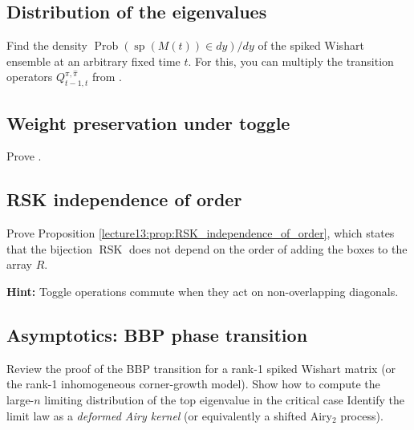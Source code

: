 \documentclass[letterpaper,11pt,oneside,reqno]{book}
\numberwithin{equation}{chapter}  %
\theoremstyle{definition}
\begin{document}
\subsection{Distribution of the eigenvalues}
\label{lecture13:prob:Wishart_non_null}

Find the density
$\operatorname{Prob}\left( \operatorname{sp}(M(t))\in dy \right)/dy$
of the spiked Wishart ensemble
at an arbitrary fixed time $t$.
For this, you can multiply the transition operators
$Q^{\pi,\hat\pi}_{t-1,t}$ from .


\subsection{Weight preservation under toggle}
\label{lecture13:prob:toggle_weight_preservation}

Prove .


\subsection{RSK independence of order}
\label{lecture13:prob:RSK_independence_of_order}

Prove Proposition \ref{lecture13:prop:RSK_independence_of_order}, which states that the bijection $\operatorname{RSK}$ does not depend on the order of adding the boxes to the array $R$.

\medskip
\noindent
\textbf{Hint:} Toggle operations commute when they act on non-overlapping diagonals.




\subsection{Asymptotics: BBP phase transition}
Review the proof of the BBP transition for a rank-1 spiked
Wishart matrix (or the rank-1 inhomogeneous corner-growth
model).  Show how to compute the large-\(n\) limiting
distribution of the top eigenvalue in the critical case
Identify the
limit law as a \emph{deformed Airy kernel} (or equivalently
a shifted Airy$_2$ process).
\end{document}
